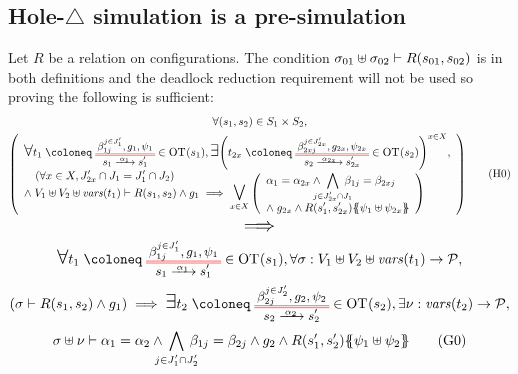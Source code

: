\documentclass{article}
\begin{document}
\subsection{Hole-\(\triangle\) simulation is a pre-simulation}\label{apx:presim}
Let \(R\) be a relation on configurations.
The condition \(\sigma_{01} \uplus \sigma_{02} \vdash R{\left(s_{01}, s_{02}\right)}\) is in both definitions and the deadlock reduction requirement will not be used so proving the following is sufficient:
\begin{multline}
	\forall \mpar{s_1, s_2} \in S_1 \times S_2, \\
	\mpar{\everymath{\displaystyle}\begin{array}{l}
		\bigsymb{\forall} t_1 \defobject \OTx{1}{}{1}{1} \in \fOT{s_1}, \bigsymb{\exists} \mpar{t_{2x} \defobject \OTx{2}{x}{2x}{2x} \in \fOT{s_2}}^{x \in X}, \\
		\quad \mpar{\forall x \in X, J'_{2x} \cap J_1 = J'_1 \cap J_2} \\[-10pt]
		\nwedge V_1 \uplus V_2 \uplus \fvars{t_1} \vdash R\mpar{s_1, s_2} \wedge g_1 \implies \operatorname*{\bigsymb{\bigvee}}_{x \in X} \mpar{\begin{array}{l}
			\alpha_1 = \alpha_{2x} \wedge \bigwedge_\subbox{j \in J'_{2x} \cap J_1} \beta_{1j} = \beta_{2xj} \\[12pt]
			\nwedge g_{2x} \wedge R\mpar{s'_1, s'_{2x}}\psubst{\psi_1 \uplus \psi_{2x}}
		\end{array}}
	\end{array}} \hyp{0}
\end{multline}
\[ \text{\Large\(\displaystyle \implies\)} \]\vspace{-1cm}
\begin{multline}
	\bigsymb{\forall} t_1 \defobject \OTx{1}{}{1}{1} \in \fOT{s_1}, \forall \sigma: V_1 \uplus V_2 \uplus \fvars{t_1} \to \values, \\
	\mpar{\sigma \vdash R\mpar{s_1, s_2} \wedge g_1} \implies \bigsymb{\exists} t_2 \defobject \OTx{2}{}{2}{2} \in \fOT{s_2}, \exists \nu: \fvars{t_2} \to \values, \\
	\sigma \uplus \nu \vdash \alpha_1 = \alpha_2 \wedge \bigwedge_\subbox{j \in J'_1 \cap J'_2} \beta_{1j} = \beta_{2j} \wedge g_2 \wedge R\mpar{s'_1, s'_2}\psubst{\psi_1 \uplus \psi_2} \goal{0}
\end{multline}
\end{document}
